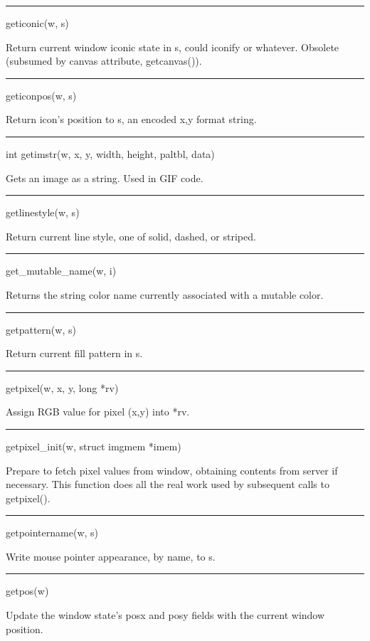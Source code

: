 \bigskip\hrule\vspace{0.1cm}
\noindent
geticonic(w, s)


Return current window iconic state in s, could
{\textquotedbl}iconify{\textquotedbl} or whatever. Obsolete (subsumed
by canvas attribute, getcanvas()).


\bigskip\hrule\vspace{0.1cm}
\noindent
geticonpos(w, s)


Return icon's position to \textsf{s}, an encoded
{\textquotedbl}x,y{\textquotedbl} format string.


\bigskip\hrule\vspace{0.1cm}
\noindent
int getimstr(w, x, y, width, height, paltbl, data)


Gets an image as a string. Used in GIF code.


\bigskip\hrule\vspace{0.1cm}
\noindent
getlinestyle(w, s)


Return current line style, one of solid, dashed, or striped.


\bigskip\hrule\vspace{0.1cm}
\noindent
get\_mutable\_name(w, i)


Returns the string color name currently associated with a mutable color.


\bigskip\hrule\vspace{0.1cm}
\noindent
getpattern(w, s)


Return current fill pattern in s.


\bigskip\hrule\vspace{0.1cm}
\noindent
getpixel(w, x, y, long *rv)


Assign RGB value for pixel (x,y) into *rv.


\bigskip\hrule\vspace{0.1cm}
\noindent
getpixel\_init(w, struct imgmem *imem)


Prepare to fetch pixel values from window, obtaining contents from
server if necessary. This function does all the real work used by
subsequent calls to getpixel().


\bigskip\hrule\vspace{0.1cm}
\noindent
getpointername(w, s)


Write mouse pointer appearance, by name, to s.


\bigskip\hrule\vspace{0.1cm}
\noindent
getpos(w)


Update the window state's posx and posy fields with the current window position.


